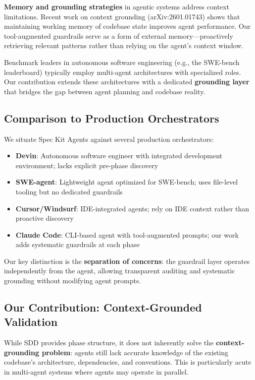 \documentclass[sigconf,anonymous,review]{acmart}
\begin{document}
\textbf{Memory and grounding strategies} in agentic systems address context limitations. Recent work on context grounding (arXiv:2601.01743) shows that maintaining working memory of codebase state improves agent performance. Our tool-augmented guardrails serve as a form of external memory---proactively retrieving relevant patterns rather than relying on the agent's context window.

Benchmark leaders in autonomous software engineering (e.g., the SWE-bench leaderboard) typically employ multi-agent architectures with specialized roles. Our contribution extends these architectures with a dedicated \textbf{grounding layer} that bridges the gap between agent planning and codebase reality.

\subsection{Comparison to Production Orchestrators}

We situate Spec Kit Agents against several production orchestrators:

\begin{itemize}
  \item \textbf{Devin}: Autonomous software engineer with integrated development environment; lacks explicit pre-phase discovery
  \item \textbf{SWE-agent}: Lightweight agent optimized for SWE-bench; uses file-level tooling but no dedicated guardrails
  \item \textbf{Cursor/Windsurf}: IDE-integrated agents; rely on IDE context rather than proactive discovery
  \item \textbf{Claude Code}: CLI-based agent with tool-augmented prompts; our work adds systematic guardrails at each phase
\end{itemize}

Our key distinction is the \textbf{separation of concerns}: the guardrail layer operates independently from the agent, allowing transparent auditing and systematic grounding without modifying agent prompts.

\subsection{Our Contribution: Context-Grounded Validation}

While SDD provides phase structure, it does not inherently solve the \textbf{context-grounding problem}: agents still lack accurate knowledge of the existing codebase's architecture, dependencies, and conventions. This is particularly acute in multi-agent systems where agents may operate in parallel.
\end{document}
